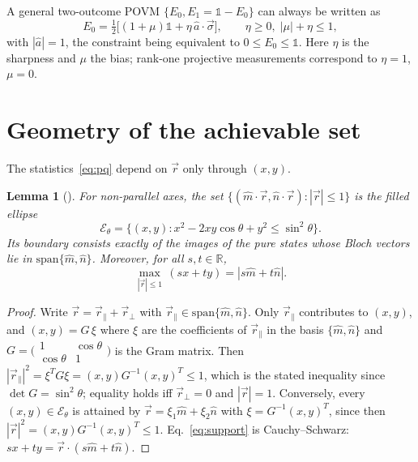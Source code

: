 \documentclass[aps,pra,twocolumn,superscriptaddress,nofootinbib,floatfix]{revtex4-2}
\newtheorem{lemma}{Lemma}
\theoremstyle{definition}
\newcommand{\vecr}{\vec r}
\newcommand{\mhat}{\hat m}
\newcommand{\nhat}{\hat n}
\newcommand{\vsigma}{\vec\sigma}
\begin{document}
A general two-outcome POVM $\{E_0,E_1=\mathds{1}-E_0\}$ can always be written as
\begin{equation}
  E_0=\tfrac12\bigl[(1+\mu)\mathds{1}+\eta\,\hat a\cdot\vsigma\bigr],
  \qquad \eta\ge0,\;|\mu|+\eta\le1 ,
  \label{eq:povm}
\end{equation}
with $|\hat a|=1$, the constraint being equivalent to $0\le E_0\le\mathds{1}$.
Here $\eta$ is the sharpness and $\mu$ the bias; rank-one projective
measurements correspond to $\eta=1$, $\mu=0$.

\section{Geometry of the achievable set}
\label{sec:geometry}

The statistics~\eqref{eq:pq} depend on $\vecr$ only through $(x,y)$.

\begin{lemma}[\cite{LiQiao2015,KTW2014,Abbott2016}]
\label{lem:ellipse}
For non-parallel axes, the set $\{(\mhat\cdot\vecr,\nhat\cdot\vecr):|\vecr|\le1\}$ is the
filled ellipse
\begin{equation}
  \mathcal{E}_\theta=\bigl\{(x,y): x^2-2xy\cos\theta+y^2\le\sin^2\theta\bigr\}.
\end{equation}
Its boundary consists exactly of the images of the pure states whose Bloch
vectors lie in $\mathrm{span}\{\mhat,\nhat\}$. Moreover, for all $s,t\in\mathbb{R}$,
\begin{equation}
  \max_{|\vecr|\le1}\,(sx+ty)=|s\mhat+t\nhat| .
  \label{eq:support}
\end{equation}
\end{lemma}

\begin{proof}
Write $\vecr=\vec r_\parallel+\vec r_\perp$ with $\vec r_\parallel\in\mathrm{span}\{\mhat,\nhat\}$.
Only $\vec r_\parallel$ contributes to $(x,y)$, and $(x,y)=G\,\xi$ where $\xi$ are the
coefficients of $\vec r_\parallel$ in the basis $\{\mhat,\nhat\}$ and
$G=\bigl(\begin{smallmatrix}1&\cos\theta\\ \cos\theta&1\end{smallmatrix}\bigr)$
is the Gram matrix. Then $|\vec r_\parallel|^2=\xi^TG\xi=(x,y)G^{-1}(x,y)^T\le1$,
which is the stated inequality since $\det G=\sin^2\theta$; equality holds iff
$\vec r_\perp=0$ and $|\vecr|=1$. Conversely, every $(x,y)\in\mathcal{E}_\theta$
is attained by $\vecr=\xi_1\mhat+\xi_2\nhat$ with $\xi=G^{-1}(x,y)^T$, since then
$|\vecr|^2=(x,y)G^{-1}(x,y)^T\le1$. Eq.~\eqref{eq:support} is Cauchy--Schwarz:
$sx+ty=\vecr\cdot(s\mhat+t\nhat)$.
\end{proof}
\end{document}
